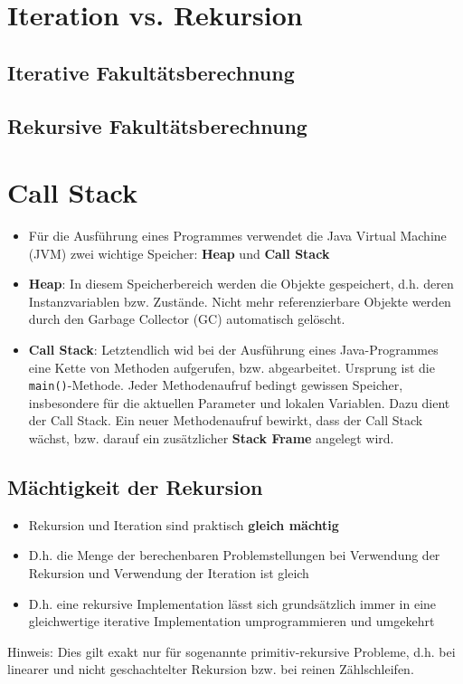 \section{Iteration vs. Rekursion}
\subsection{Iterative Fakultätsberechnung}
\subsection{Rekursive Fakultätsberechnung}
\section{Call Stack}
\begin{itemize}
    \item Für die Ausführung eines Programmes verwendet die Java Virtual Machine (JVM) zwei wichtige Speicher: \textbf{Heap} und \textbf{Call Stack}
    \item \textbf{Heap}: In diesem Speicherbereich werden die Objekte gespeichert, d.h. deren Instanzvariablen bzw. Zustände. Nicht mehr referenzierbare Objekte werden durch den Garbage Collector (GC) automatisch gelöscht.
    \item \textbf{Call Stack}: Letztendlich wid bei der Ausführung eines Java-Programmes eine Kette von Methoden aufgerufen, bzw. abgearbeitet. Ursprung ist die \texttt{main()}-Methode. Jeder Methodenaufruf bedingt gewissen Speicher, insbesondere für die aktuellen Parameter und lokalen Variablen. Dazu dient der Call Stack. Ein neuer Methodenaufruf bewirkt, dass der Call Stack wächst, bzw. darauf ein zusätzlicher \textbf{Stack Frame} angelegt wird.
\end{itemize}
\paragraph{}

\subsection{Mächtigkeit der Rekursion}
\begin{itemize}
    \item Rekursion und Iteration sind praktisch \textbf{gleich mächtig}
    \item D.h. die Menge der berechenbaren Problemstellungen bei Verwendung der Rekursion und Verwendung der Iteration ist gleich
    \item D.h. eine rekursive Implementation lässt sich grundsätzlich immer in eine gleichwertige iterative Implementation umprogrammieren und umgekehrt
\end{itemize}
Hinweis: Dies gilt exakt nur für sogenannte primitiv-rekursive Probleme, d.h. bei linearer und nicht geschachtelter Rekursion bzw. bei reinen Zählschleifen.
